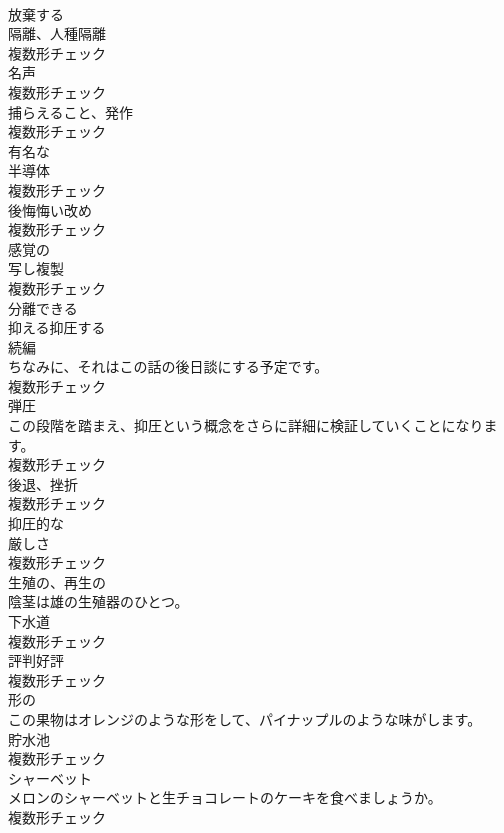 \documentclass[8pt]{extreport}
\begin{document}
\begin{CJK}{UTF8}{min}
\\	[動詞]	放棄する	
\\	[名詞]	隔離、人種隔離	
\\	複数形チェック
\\	[名詞]	名声	
\\	複数形チェック
\\	[名詞]	捕らえること、発作	
\\	複数形チェック
\\	[形容詞]	有名な	
\\	[名詞]	半導体	
\\	複数形チェック
\\	[名詞]	後悔悔い改め	
\\	複数形チェック
\\	[形容詞]	感覚の	
\\	[名詞]	写し複製	
\\	複数形チェック
\\	[形容詞]	分離できる	
\\	[動詞]	抑える抑圧する	
\\	[名詞]	続編	
\\	ちなみに、それはこの話の後日談にする予定です。	
\\	複数形チェック
\\	[名詞]	弾圧	
\\	この段階を踏まえ、抑圧という概念をさらに詳細に検証していくことになります。	
\\	複数形チェック
\\	[名詞]	後退、挫折	
\\	複数形チェック
\\	[形容詞]	抑圧的な	
\\	[名詞]	厳しさ	
\\	複数形チェック
\\	[形容詞]	生殖の、再生の	
\\	陰茎は雄の生殖器のひとつ。	
\\	[名詞]	下水道	
\\	複数形チェック
\\	[名詞]	評判好評	
\\	複数形チェック
\\	[形容詞]	形の	
\\	この果物はオレンジのような形をして、パイナップルのような味がします。	
\\	[名詞]	貯水池	
\\	複数形チェック
\\	[名詞]	シャーベット	
\\	メロンのシャーベットと生チョコレートのケーキを食べましょうか。	
\\	複数形チェック

\end{CJK}
\end{document}
